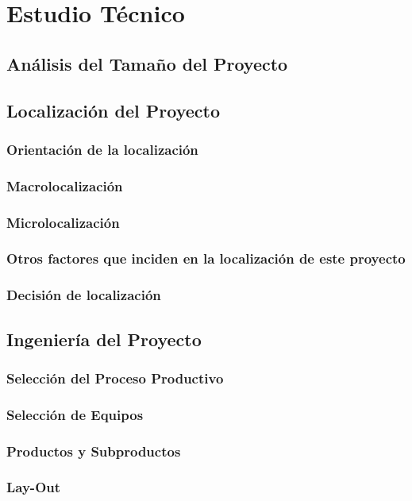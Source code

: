 \section{Estudio Técnico}
	\subsection{Análisis del Tamaño del Proyecto}
	\subsection{Localización del Proyecto}
	    \subsubsection{Orientación de la localización}
	    \subsubsection{Macrolocalización}
	    \subsubsection{Microlocalización}
	    \subsubsection{Otros factores que inciden en la localización de este proyecto}
	    \subsubsection{Decisión de localización}
	\subsection{Ingeniería del Proyecto}
	    \subsubsection{Selección del Proceso Productivo}
	    \subsubsection{Selección de Equipos}
	    \subsubsection{Productos y Subproductos}
	    \subsubsection{Lay-Out}
